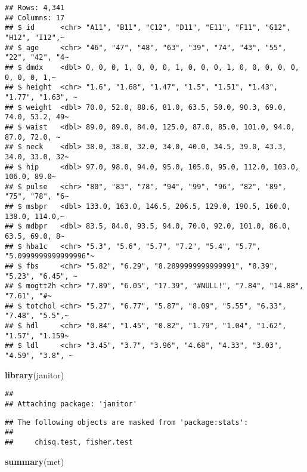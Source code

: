 \documentclass[
]{article}
\newenvironment{Shaded}{\begin{snugshade}}{\end{snugshade}}
\newcommand{\FunctionTok}[1]{\textcolor[rgb]{0.13,0.29,0.53}{\textbf{#1}}}
\newcommand{\NormalTok}[1]{#1}
\begin{document}
\begin{verbatim}
## Rows: 4,341
## Columns: 17
## $ id      <chr> "A11", "B11", "C12", "D11", "E11", "F11", "G12", "H12", "I12",~
## $ age     <chr> "46", "47", "48", "63", "39", "74", "43", "55", "22", "42", "4~
## $ dmdx    <dbl> 0, 0, 0, 1, 0, 0, 0, 1, 0, 0, 0, 1, 0, 0, 0, 0, 0, 0, 0, 0, 1,~
## $ height  <chr> "1.6", "1.68", "1.47", "1.5", "1.51", "1.43", "1.77", "1.63", ~
## $ weight  <dbl> 70.0, 52.0, 88.6, 81.0, 63.5, 50.0, 90.3, 69.0, 74.0, 53.2, 49~
## $ waist   <dbl> 89.0, 89.0, 84.0, 125.0, 87.0, 85.0, 101.0, 94.0, 87.0, 72.0, ~
## $ neck    <dbl> 38.0, 38.0, 32.0, 34.0, 40.0, 34.5, 39.0, 43.3, 34.0, 33.0, 32~
## $ hip     <dbl> 97.0, 98.0, 94.0, 95.0, 105.0, 95.0, 112.0, 103.0, 106.0, 89.0~
## $ pulse   <chr> "80", "83", "78", "94", "99", "96", "82", "89", "75", "78", "6~
## $ msbpr   <dbl> 133.0, 163.0, 146.5, 206.5, 129.0, 190.5, 160.0, 138.0, 114.0,~
## $ mdbpr   <dbl> 83.5, 84.0, 93.5, 94.0, 70.0, 92.0, 101.0, 86.0, 63.5, 69.0, 8~
## $ hba1c   <chr> "5.3", "5.6", "5.7", "7.2", "5.4", "5.7", "5.0999999999999996"~
## $ fbs     <chr> "5.82", "6.29", "8.2899999999999991", "8.39", "5.23", "6.45", ~
## $ mogtt2h <chr> "7.89", "6.05", "17.39", "#NULL!", "7.84", "14.88", "7.61", "#~
## $ totchol <chr> "5.27", "6.77", "5.87", "8.09", "5.55", "6.33", "7.48", "5.5",~
## $ hdl     <chr> "0.84", "1.45", "0.82", "1.79", "1.04", "1.62", "1.57", "1.159~
## $ ldl     <chr> "3.45", "3.7", "3.96", "4.68", "4.33", "3.03", "4.59", "3.8", ~
\end{verbatim}

\begin{Shaded}
\begin{Highlighting}[]
\FunctionTok{library}\NormalTok{(janitor)}
\end{Highlighting}
\end{Shaded}

\begin{verbatim}
## 
## Attaching package: 'janitor'
\end{verbatim}

\begin{verbatim}
## The following objects are masked from 'package:stats':
## 
##     chisq.test, fisher.test
\end{verbatim}

\begin{Shaded}
\begin{Highlighting}[]
\FunctionTok{summary}\NormalTok{(met)}
\end{Highlighting}
\end{Shaded}
\end{document}
